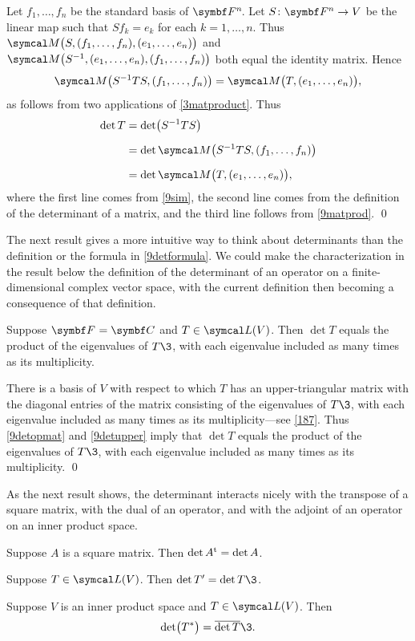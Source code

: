 \proof
Let $f_1, \ldots, f_n$ be the standard basis of $\FF{n}$. Let $\fun S {\F n} V$ be the linear map such that $Sf_k = e_k$ for each $k = 1, \ldots, n$. Thus $\M\paren[\big]{ S, (f_1, \ldots, f_n), (e_1, \ldots, e_n) }$ and
$\M\paren[\big]{ S^{-1} , (e_1, \ldots, e_n), (f_1, \ldots, f_n) }$ both equal the  identity matrix. Hence
\begin{equation} \label{9matprod}
\M\paren[\big]{ S^{-1} T S, (f_1, \ldots, f_n) } = \M\paren[\big]{ T, (e_1, \ldots, e_n) },
\end{equation}%
as follows from two applications of \ref{3matproduct}. Thus
\begin{align*}
\det T &= \det\paren[\big]{S^{-1} T S } \\[6bp]
&= \det \M\paren[\big]{ S^{-1} T S, (f_1, \ldots, f_n) } \\[6bp]
&= \det \M\paren[\big]{ T, (e_1, \ldots, e_n) },
\end{align*}
where the first line comes from \ref{9sim}, the second line comes from the definition of the determinant of a matrix, and the third line follows from \ref{9matprod}.
\qed

The next result gives a more intuitive way to think about determinants than the definition or the formula in \ref{9detformula}. We could make the characterization in the result below the definition of the determinant of an operator on a finite-dimensional complex vector space, with the current definition then becoming a consequence of that definition.

{Suppose $\F{} = \C{}$ and $T \in \L(V)$. Then $\det T$ equals the product of the eigenvalues of $T\3$, with each eigenvalue included as many times as its multiplicity.}

\proof
There is a basis of $V$ with respect to which $T$ has an upper-triangular matrix with the diagonal entries of the matrix consisting of the eigenvalues of $T\3$, with each eigenvalue included as many times as its multiplicity---see \ref{187}. Thus \ref{9detopmat} and \ref{9detupper} imply that $\det T$ equals the product of the eigenvalues of $T\3$, with each eigenvalue included as many times as its multiplicity.
\qed

As the next result shows, the determinant interacts nicely with the transpose of a square matrix, with the dual of an operator, and with the adjoint of an operator on an inner product space.

{\begin{subtheorem}
\item
Suppose $A$ is a square matrix. Then $\det A^{\text{t}} = \det A$.
\item
Suppose $T \in \L(V)$. Then $\det T' = \det T\3$.
\item
Suppose $V$ is an inner product space and $T \in \L(V)$. Then
\[
\det \paren[\big]{T^*} = \overline{\det T}\3.
\]
\end{subtheorem}}

